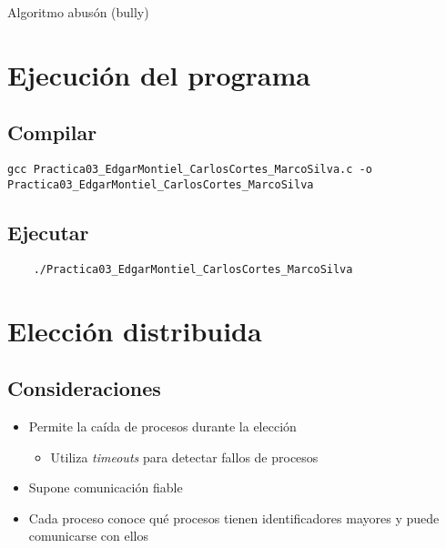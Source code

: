 \documentclass[a4paper,12pt]{article}
\begin{document}


\newpage

\begin{center}
    {\huge Algoritmo abusón (bully)}
\end{center}

\section*{Ejecución del programa}

\subsection*{Compilar}
\begin{verbatim}
gcc Practica03_EdgarMontiel_CarlosCortes_MarcoSilva.c -o Practica03_EdgarMontiel_CarlosCortes_MarcoSilva
\end{verbatim}

\subsection*{Ejecutar}
\begin{verbatim}
    ./Practica03_EdgarMontiel_CarlosCortes_MarcoSilva
\end{verbatim}


\section*{Elección distribuida}

\subsection*{Consideraciones}

\begin{itemize}
    \item Permite la caída de procesos durante la elección
     \begin{itemize}
        \item Utiliza \textit{timeouts} para detectar fallos de procesos
     \end{itemize}
    \item Supone comunicación fiable
    \item Cada proceso conoce qué procesos tienen identificadores mayores y puede comunicarse con ellos
\end{itemize}
\end{document}
